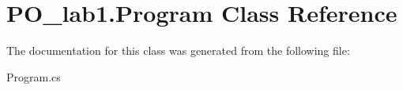 \hypertarget{class_p_o__lab1_1_1_program}{}\section{P\+O\+\_\+lab1.\+Program Class Reference}
\label{class_p_o__lab1_1_1_program}


The documentation for this class was generated from the following file\+:\begin{DoxyCompactItemize}
\item 
Program.\+cs\end{DoxyCompactItemize}
